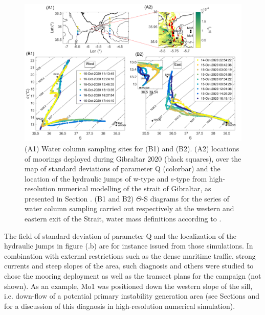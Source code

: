  
\begin{figure}[!h]
 \includegraphics[width=\textwidth]{./GBR3D/Fig_Moor.png}
 \caption [(A)Locations of moorings and water column sampling stations. (B) $\Theta$-S diagrams.]{(A1) Water column sampling sites for (B1) and (B2). (A2) locations of moorings deployed during Gibraltar 2020 (black squares), over the map of standard deviations of parameter Q (colorbar) and the location of the hydraulic jumps of w-type and s-type from high-resolution numerical modelling of the strait of Gibraltar, as presented in Section . (B1 and B2) $\Theta$-S diagrams for the series of water column sampling carried out respectively at the western and eastern exit of the Strait, water mass definitions according to \citet{Naranjo2015}.}
 \label{fig_moor}
\end{figure}

The field of standard deviation of parameter Q and the localization of the hydraulic jumps in figure (.b) are for instance issued from those simulations. In combination with external restrictions such as the dense maritime traffic, strong currents and steep slopes of the area, such diagnosis and others were studied to chose the mooring deployment as well as the transect plans for the campaign (not shown). As an example, Mo1 was positioned down the western slope of the sill, i.e. down-flow of a potential primary instability generation area (see Sections  and  for a discussion of this diagnosis in high-resolution numerical simulation).

